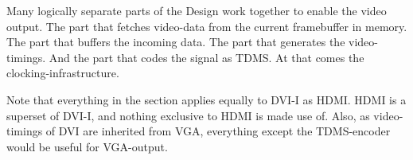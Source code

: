 \documentclass[../main/report.tex]{subfiles}
\begin{document}
Many logically separate parts of the Design work together to enable the video output.
The part that fetches video-data from the current framebuffer in memory.
The part that buffers the incoming data.
The part that generates the video-timings.
And the part that codes the signal as TDMS.
At that comes the clocking-infrastructure.

Note that everything in the section applies equally to DVI-I as HDMI. HDMI is a superset of DVI-I, and nothing exclusive to HDMI is made use of.
Also, as video-timings of DVI are inherited from VGA, everything except the TDMS-encoder would be useful for VGA-output.
\end{document}
